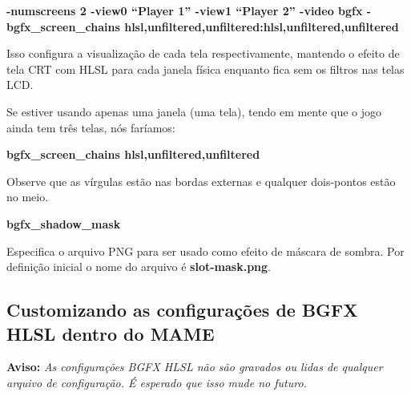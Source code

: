 \documentclass[letterpaper,10pt,brazil]{sphinxmanual}
\begin{document}
\begin{DUlineblock}{0em}
\begin{DUlineblock}{\DUlineblockindent}
\item[] 
\item[]
\begin{DUlineblock}{\DUlineblockindent}
\item[] \textbf{-numscreens 2 -view0 ``Player 1'' -view1 ``Player 2'' -video bgfx -bgfx\_screen\_chains hlsl,unfiltered,unfiltered:hlsl,unfiltered,unfiltered}
\item[] 
\end{DUlineblock}
\item[] Isso configura a visualização de cada tela respectivamente, mantendo o efeito de tela CRT com HLSL para cada janela física enquanto fica sem os filtros nas telas LCD.
\item[] 
\item[] Se estiver usando apenas uma janela (uma tela), tendo em mente que o jogo ainda tem três telas, nós faríamos:
\item[] 
\item[]
\begin{DUlineblock}{\DUlineblockindent}
\item[] \textbf{bgfx\_screen\_chains hlsl,unfiltered,unfiltered}
\item[] 
\item[] 
\end{DUlineblock}
\item[] Observe que as vírgulas estão nas bordas externas e qualquer dois-pontos estão no meio.
\item[] 
\end{DUlineblock}
\item[] \textbf{bgfx\_shadow\_mask}
\item[] 
\item[]
\begin{DUlineblock}{\DUlineblockindent}
\item[] Especifica o arquivo PNG para ser usado como efeito de máscara de sombra. Por definição inicial o nome do arquivo é \textbf{slot-mask.png}.
\item[] 
\item[] 
\end{DUlineblock}
\end{DUlineblock}


\subsection{Customizando as configurações de BGFX HLSL dentro do MAME}
\label{advanced/bgfx:customizando-as-configuracoes-de-bgfx-hlsl-dentro-do-mame}
\textbf{Aviso:} \emph{As configurações BGFX HLSL não são gravados ou lidas de
qualquer arquivo de configuração. É esperado que isso mude no futuro.}
\end{document}
